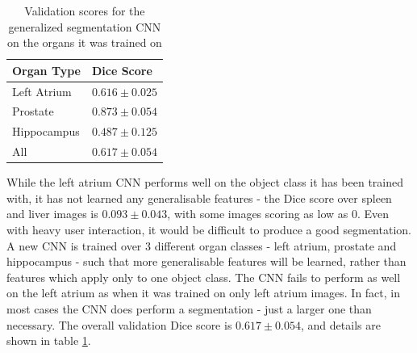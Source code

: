 \begin{table}[h!]
\centering
\begin{tabular}{|l|l|}
\hline
Organ Type   & Dice Score         \\ \hline
Left Atrium  & $0.616 \pm 0.025$ \\ 
Prostate     & $0.873 \pm 0.054$ \\ 
Hippocampus  & $0.487 \pm 0.125$ \\ \hline
All          & $0.617 \pm 0.054$ \\ \hline
\end{tabular}
\caption{Validation scores for the generalized segmentation CNN on the organs it was trained on}
\label{tab:resGen}
\end{table}

While the left atrium CNN performs well on the object class it has been trained with, it has not learned any generalisable features - the Dice score over spleen and liver images is $0.093 \pm 0.043$, with some images scoring as low as 0. Even with heavy user interaction, it would be difficult to produce a good segmentation. A new CNN is trained over 3 different organ classes - left atrium, prostate and hippocampus - such that more generalisable features will be learned, rather than features which apply only to one object class. The CNN fails to perform as well on the left atrium as when it was trained on only left atrium images. In fact, in most cases the CNN does perform a segmentation - just a larger one than necessary. The overall validation Dice score is $0.617 \pm 0.054$, and details are shown in table \ref{tab:resGen}. 

